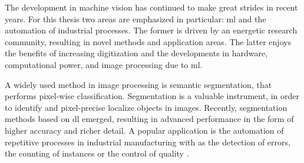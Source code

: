 


The development in machine vision has continued to make great strides in recent years. 
For this thesis two areas are emphasized in particular: \gls{ml} and the automation of industrial processes.
The former is driven by an energetic research community, resulting in novel methods and application areas.
The latter enjoys the benefits of increasing digitization and the developments in hardware, computational power, and image processing due to \gls{ml}.


A widely used method in image processing is semantic segmentation, that performs pixel-wise classification.
Segmentation is a valuable instrument, in order to identify and pixel-precise localize objects in images.
Recently, segmentation methods based on \gls{dl} emerged, resulting in advanced performance in the form of higher accuracy and richer detail.
A popular application is the automation of repetitive processes in industrial manufacturing with as the detection of errors, the counting of instances or the control of quality \cite{Rah19-IoT} \cite{Chen19-AnomalyDetectionManufacturing}.

